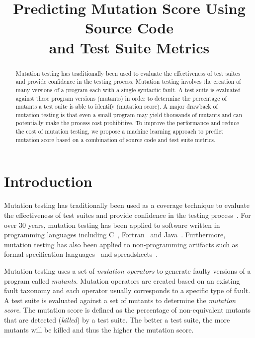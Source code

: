 \documentclass[10pt,conference,compsocconf]{IEEEtran}
\begin{document}
\title{Predicting Mutation Score Using Source Code\\and Test Suite Metrics}


\author{
}


\maketitle


\begin{abstract}
Mutation testing has traditionally been used to evaluate the effectiveness of test suites and provide confidence in the testing process. Mutation testing involves the creation of many versions of a program each with a single syntactic fault. A test suite is evaluated against these program versions (mutants) in order to determine the percentage of mutants a test suite is able to identify (mutation score). A major drawback of mutation testing is that even a small program may yield thousands of mutants and can potentially make the process cost prohibitive. To improve the performance and reduce the cost of mutation testing, we propose a machine learning approach to predict mutation score based on a combination of source code and test suite metrics.
\end{abstract}


\IEEEpeerreviewmaketitle


\section{Introduction}
\label{sec:introduction}
Mutation testing has traditionally been used as a coverage technique to evaluate the effectiveness of test suites and provide confidence in the testing process~\cite{DLS78, JH10}. For over 30 years, mutation testing has been applied to software written in programming languages including C~\cite{DM96, JH08}, Fortran~\cite{KO91} and Java~\cite{MKO02, BCD06}. Furthermore, mutation testing has also been applied to non-programming artifacts such as formal specification languages~\cite{ABM98} and spreadsheets~\cite{AE09}.

Mutation testing uses a set of \emph{mutation operators} to generate faulty versions of a program called \emph{mutants}. Mutation operators are created based on an existing fault taxonomy and each operator usually corresponds to a specific type of fault. A test suite is evaluated against a set of mutants to determine the \emph{mutation score}. The mutation score is defined as the percentage of non-equivalent mutants that are detected (\emph{killed}) by a test suite. The better a test suite, the more mutants will be killed and thus the higher the mutation score.
\end{document}
